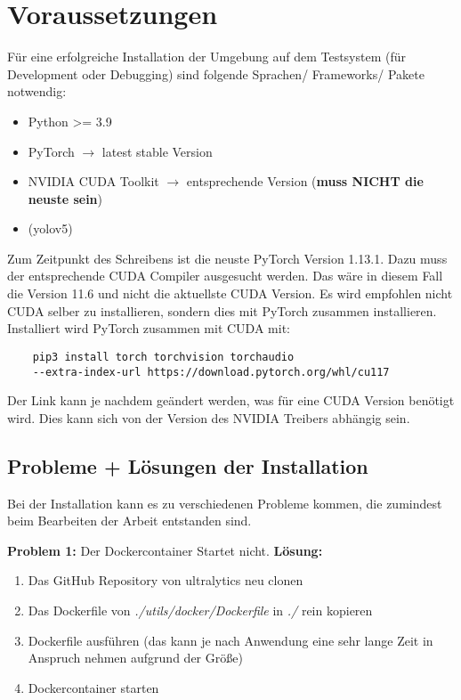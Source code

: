 \chapter{Voraussetzungen}

Für eine erfolgreiche Installation der Umgebung auf dem Testsystem (für Development oder Debugging) sind folgende Sprachen/ Frameworks/ Pakete notwendig:
\begin{itemize}
    \item Python >= 3.9
    \item PyTorch $\rightarrow$ latest stable Version
    \item NVIDIA CUDA Toolkit $\rightarrow$ entsprechende Version (\textbf{muss NICHT die neuste sein})
    \item (\ac{yolo}v5)
\end{itemize}

Zum Zeitpunkt des Schreibens ist die neuste PyTorch Version 1.13.1. Dazu muss der entsprechende CUDA Compiler ausgesucht werden. Das wäre in diesem Fall die Version 11.6 und nicht die aktuellste CUDA Version. Es wird empfohlen nicht CUDA selber zu installieren, sondern dies mit PyTorch zusammen installieren. Installiert wird PyTorch zusammen mit CUDA mit:
\begin{verbatim}
    pip3 install torch torchvision torchaudio 
    --extra-index-url https://download.pytorch.org/whl/cu117
\end{verbatim}
Der Link kann je nachdem geändert werden, was für eine CUDA Version benötigt wird. Dies kann sich von der Version des NVIDIA Treibers abhängig sein.
\section{Probleme + Lösungen der Installation}

Bei der Installation kann es zu verschiedenen Probleme kommen, die zumindest beim Bearbeiten der Arbeit entstanden sind.

\textbf{Problem 1:} Der Dockercontainer Startet nicht.
\label{text:docker}
\textbf{Lösung:} 
\begin{enumerate}
    \item Das GitHub Repository von ultralytics \cite{glennjocher.2023} neu clonen 
    \item Das Dockerfile von \textit{./utils/docker/Dockerfile} in \textit{./} rein kopieren
    \item Dockerfile ausführen  (das kann je nach Anwendung eine sehr lange Zeit in Anspruch nehmen aufgrund der Größe)
    \item Dockercontainer starten
\end{enumerate}

